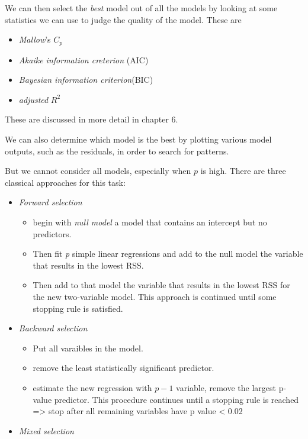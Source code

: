 \documentclass[
  letterpaper,
  DIV=11,
  numbers=noendperiod]{scrreprt}
\providecommand{\tightlist}{%
  \setlength{\itemsep}{0pt}\setlength{\parskip}{0pt}}\usepackage{longtable,booktabs,array}
\begin{document}
\begin{enumerate}
  We can then select the \emph{best} model out of all the models by
  looking at some statistics we can use to judge the quality of the
  model. These are

  \begin{itemize}
  \tightlist
  \item
    \emph{Mallow}'s \(C_p\)
  \item
    \emph{Akaike information creterion} (AIC)
  \item
    \emph{Bayesian information criterion}(BIC)
  \item
    \emph{adjusted} \(R^2\)
  \end{itemize}

  These are discussed in more detail in chapter 6.

  We can also determine which model is the best by plotting various
  model outputs, such as the residuals, in order to search for patterns.

  But we cannot consider all models, especially when \(p\) is high.
  There are three classical approaches for this task:

  \begin{itemize}
  \tightlist
  \item
    \emph{Forward selection}

    \begin{itemize}
    \item
      begin with \emph{null model} a model that contains an intercept
      but no predictors.
    \item
      Then fit \emph{p} simple linear regressions and add to the null
      model the variable that results in the lowest RSS.
    \item
      Then add to that model the variable that results in the lowest RSS
      for the new two-variable model. This approach is continued until
      some stopping rule is satisfied.
    \end{itemize}
  \item
    \emph{Backward selection}

    \begin{itemize}
    \tightlist
    \item
      Put all varaibles in the model.
    \item
      remove the least statistically significant predictor.
    \item
      estimate the new regression with \(p-1\) variable, remove the
      largest p-value predictor. This procedure continues until a
      stopping rule is reached =\textgreater{} stop after all remaining
      variables have p value \textless{} 0.02
    \end{itemize}
  \item
    \emph{Mixed selection}


\end{itemize}
\end{enumerate}
\end{document}

